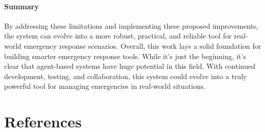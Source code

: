 \documentclass[a4paper]{article}
\begin{document}
\paragraph{Summary}
By addressing these limitations and implementing these proposed improvements, the system can evolve into a more robust, practical, and reliable tool for real-world emergency response scenarios.
Overall, this work lays a solid foundation for building smarter emergency response tools. While it's just the beginning, it's clear that agent-based systems have huge potential in this field. With continued development, testing, and collaboration, this system could evolve into a truly powerful tool for managing emergencies in real-world situations.

\section{References}


\end{document}
